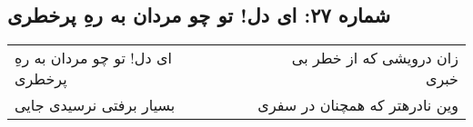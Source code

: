 \begin{center}
\section*{شماره ۲۷: ای دل! تو چو مردان به رهِ پرخطری}
\label{sec:027}
\begin{longtable}{l p{0.5cm} r}
ای دل! تو چو مردان به رهِ پرخطری
&&
زان درویشی که از خطر بی خبری
\\
بسیار برفتی نرسیدی جایی
&&
وین نادرهتر که همچنان در سفری
\\
\end{longtable}
\end{center}
